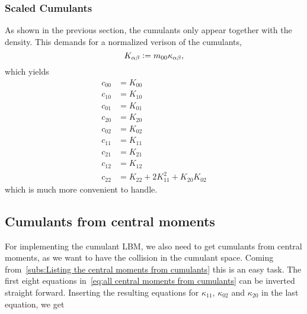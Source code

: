 \documentclass{article}
\begin{document}
\subsubsection{Scaled Cumulants}
\label{subs:Scaled Cumulants}

As shown in the previous section, the cumulants only appear together with the density. This demands for a normalized verison of the cumulants,
\begin{equation}
  K_{\alpha\beta} \mathrel{\mathop:}= m_{00}\kappa_{\alpha\beta},
\end{equation}
which yields
\begin{align}
  \label{eq:all central moments from normalized cumulants}
  c_{00} & = K_{00} \\
  c_{10} & = K_{10} \\
  c_{01} & = K_{01} \\
  c_{20} & = K_{20} \\
  c_{02} & = K_{02} \\
  c_{11} & = K_{11} \\
  c_{21} & = K_{21} \\
  c_{12} & = K_{12} \\
  c_{22} & = K_{22} + 2K_{11}^2 + K_{20}K_{02}
\end{align}
which is much more convenient to handle.


\subsection{Cumulants from central moments}
\label{sub:Cumulants from central moments}

For implementing the cumulant LBM, we also need to get cumulants from central moments, as we want to have the collision in the cumulant space. Coming from~\ref{subs:Listing the central moments from cumulants} this is an easy task. The first eight equations in~\eqref{eq:all central moments from cumulants} can be inverted straight forward.
Inserting the resulting equations for $\kappa_{11}$, $\kappa_{02}$ and $\kappa_{20}$ in the last equation, we get
\end{document}

